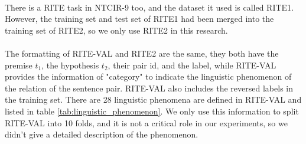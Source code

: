 \documentclass{article}
\begin{document}
\begin{CJK*}{UTF8}{bkai}
\paragraph{}
There is a RITE task in NTCIR-9 too, and the dataset it used is called RITE1\cite{ntcir9rite1}. However, the training set and test set of RITE1 had been merged into the training set of RITE2, so we only use RITE2 in this research.

\paragraph{}
The formatting of RITE-VAL and RITE2 are the same, they both have the premise $t_1$, the hypothesis $t_2$, their pair id, and the label, while RITE-VAL provides the information of "category" to indicate the linguistic phenomenon of the relation of the sentence pair. RITE-VAL also includes the reversed labels in the training set. There are 28 linguistic phenomena are defined in RITE-VAL and listed in table \ref{tab:linguistic_phenomenon}. We only use this information to split RITE-VAL into 10 folds, and it is not a critical role in our experiments, so we didn't give a detailed description of the phenomenon.
\begin{table}[ht!]
  \centering
\end{table}
\end{CJK*}
\end{document}
